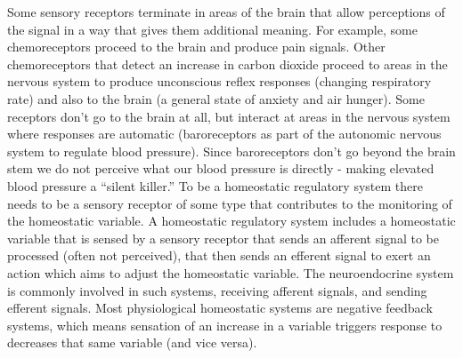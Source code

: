 Some sensory receptors terminate in areas of the brain that allow perceptions of the signal in a way that gives them additional meaning. For example, some chemoreceptors proceed to the brain and produce pain signals. Other chemoreceptors that detect an increase in carbon dioxide proceed to areas in the nervous system to produce unconscious reflex responses (changing respiratory rate) and also to the brain (a general state of anxiety and air hunger). Some receptors don’t go to the brain at all, but interact at areas in the nervous system where responses are automatic (baroreceptors as part of the autonomic nervous system to regulate blood pressure). Since baroreceptors don’t go beyond the brain stem we do not perceive what our blood pressure is directly - making elevated blood pressure a “silent killer.” To be a homeostatic regulatory system there needs to be a sensory receptor of some type that contributes to the monitoring of the homeostatic variable. A homeostatic regulatory system includes a homeostatic variable that is sensed by a sensory receptor that sends an afferent signal to be processed (often not perceived), that then sends an efferent signal to exert an action which aims to adjust the homeostatic variable. The neuroendocrine system is commonly involved in such systems, receiving afferent signals, and sending efferent signals. Most physiological homeostatic systems are negative feedback systems, which means sensation of an increase in a variable triggers response to decreases that same variable (and vice versa).

